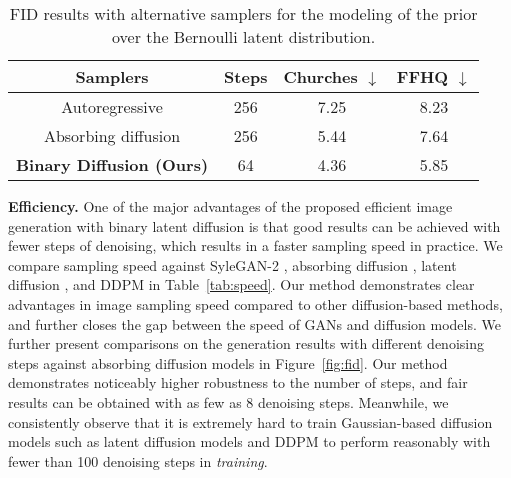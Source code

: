 \documentclass[10pt,twocolumn,letterpaper]{article}
\begin{document}
\begin{table}[]
    \caption{FID results with alternative samplers for the modeling of the prior over the Bernoulli latent distribution. }
    \label{tab:samplers}
    \centering
    \small
    \begin{tabular}{c| c c c }
    \toprule
        Samplers & Steps & Churches $\downarrow$ & FFHQ $\downarrow$\\
    \midrule
        Autoregressive & 256 &7.25 & 8.23 \\
        Absorbing diffusion & 256 & 5.44 & 7.64 \\
        \textbf{Binary Diffusion (Ours)} & 64 & 4.36 & 5.85  \\
     
    \bottomrule
    \end{tabular}%
\end{table}




\noindent \textbf{Efficiency.}
One of the major advantages of the proposed efficient image generation with binary latent diffusion is that good results can be achieved with fewer steps of denoising, which results in a faster sampling speed in practice. We compare sampling speed against SyleGAN-2 \cite{stylegan2}, absorbing diffusion \cite{unleashing}, latent diffusion \cite{latent}, and DDPM \cite{ddpm} in Table~\ref{tab:speed}. Our method demonstrates clear advantages in image sampling speed compared to other diffusion-based methods, and further closes the gap between the speed of GANs and diffusion models. We further present comparisons on the generation results with different denoising steps against absorbing diffusion models \cite{unleashing} in Figure~\ref{fig:fid}. Our method demonstrates noticeably higher robustness to the number of steps, and fair results can be obtained with as few as 8 denoising steps. Meanwhile, we consistently observe that it is extremely hard to train Gaussian-based diffusion models such as latent diffusion models \cite{latent} and DDPM \cite{ddpm} to perform reasonably with fewer than 100 denoising steps in \textit{training}.
\end{document}
